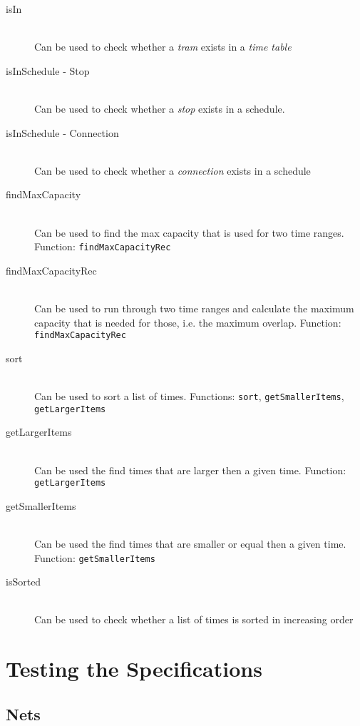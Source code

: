 \documentclass[a4]{article}
\begin{document}
\begin{description}
    \item[isIn] \hfill \\ Can be used to check whether a \emph{tram} exists in a \emph{time table}
    \item[isInSchedule - Stop] \hfill \\ Can be used to check whether a \emph{stop} exists in a schedule.
    \item[isInSchedule - Connection] \hfill \\ Can be used to check whether a \emph{connection} exists in a schedule
    \item[findMaxCapacity] \hfill \\ Can be used to find the max capacity that is used for two time ranges. Function: \verb=findMaxCapacityRec=
    \item[findMaxCapacityRec] \hfill \\ Can be used to run through two time ranges and calculate the maximum capacity that is needed for those, i.e. the maximum overlap. Function: \verb=findMaxCapacityRec=
    \item[sort] \hfill \\ Can be used to sort a list of times. Functions: \verb=sort=, \verb=getSmallerItems=, \verb=getLargerItems=
    \item[getLargerItems] \hfill \\ Can be used the find times that are larger then a given time. Function: \verb=getLargerItems=
    \item[getSmallerItems] \hfill \\ Can be used the find times that are smaller or equal then a given time. Function: \verb=getSmallerItems=
    \item[isSorted] \hfill \\ Can be used to check whether a list of times is sorted in increasing order
\end{description}

\section{Testing the Specifications}

\subsection{Nets}


\end{document}

